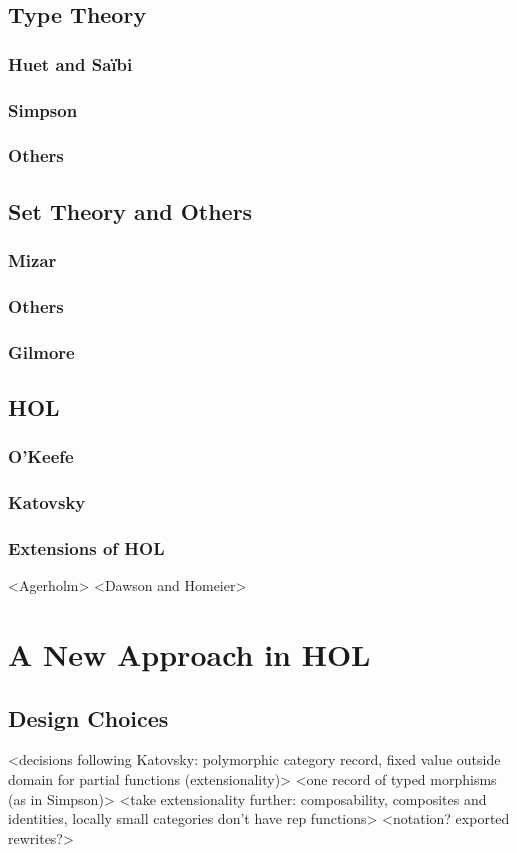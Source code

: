 \documentclass{article}
\begin{document}
\subsection{Type Theory}
\subsubsection{Huet and Sa{\"i}bi}
\cite{DBLP:conf/birthday/HuetS00}
\subsubsection{Simpson}
\subsubsection{Others}
\subsection{Set Theory and Others}
\subsubsection{Mizar}
\subsubsection{Others}
\subsubsection{Gilmore}
\subsection{HOL}
\subsubsection{O'Keefe}
\subsubsection{Katovsky}
\subsubsection{Extensions of HOL}
<Agerholm>
<Dawson and Homeier>
\section{A New Approach in HOL}
\subsection{Design Choices}
<decisions following Katovsky: polymorphic category record, fixed value outside domain for partial functions (extensionality)>
<one record of typed morphisms (as in Simpson)>
<take extensionality further: composability, composites and identities, locally small categories don't have rep functions>
<notation? exported rewrites?>
\end{document}
